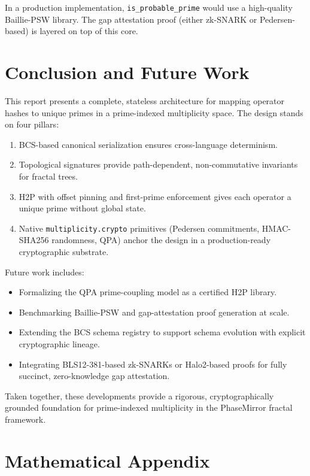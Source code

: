 \documentclass[11pt]{article}
\begin{document}
In a production implementation, \texttt{is\_probable\_prime} would use a high-quality Baillie-PSW library. The gap attestation proof (either zk-SNARK or Pedersen-based) is layered on top of this core.

\section{Conclusion and Future Work}

This report presents a complete, stateless architecture for mapping operator hashes to unique primes in a prime-indexed multiplicity space. The design stands on four pillars:

\begin{enumerate}[leftmargin=*]
  \item BCS-based canonical serialization ensures cross-language determinism.
  \item Topological signatures provide path-dependent, non-commutative invariants for fractal trees.
  \item H2P with offset pinning and first-prime enforcement gives each operator a unique prime without global state.
  \item Native \texttt{multiplicity.crypto} primitives (Pedersen commitments, HMAC-SHA256 randomness, QPA) anchor the design in a production-ready cryptographic substrate.
\end{enumerate}

Future work includes:

\begin{itemize}[leftmargin=*]
  \item Formalizing the QPA prime-coupling model as a certified H2P library.
  \item Benchmarking Baillie-PSW and gap-attestation proof generation at scale.
  \item Extending the BCS schema registry to support schema evolution with explicit cryptographic lineage.
  \item Integrating BLS12-381-based zk-SNARKs or Halo2-based proofs for fully succinct, zero-knowledge gap attestation.
\end{itemize}

Taken together, these developments provide a rigorous, cryptographically grounded foundation for prime-indexed multiplicity in the PhaseMirror fractal framework.

\appendix
\section{Mathematical Appendix}
\label{app:math}
\end{document}
